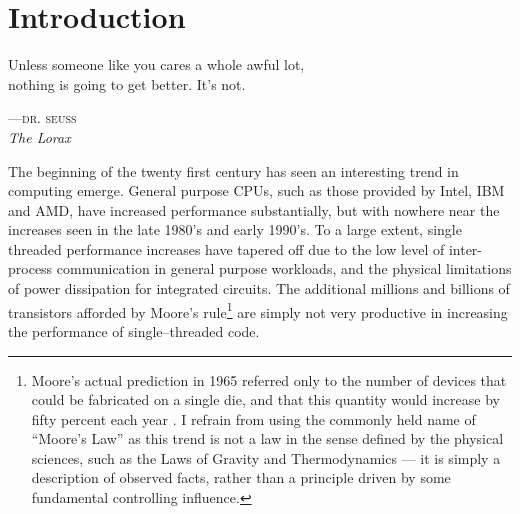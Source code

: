 
\chapter{Introduction}
\label{ch:introduction}

\epigraph{%
Unless someone like you cares a whole awful lot,\\
nothing is going to get better. It's not.}%
{\textsc{---dr. seuss}\\\textit{The Lorax}}




The beginning of the twenty first century has seen an interesting trend in
computing emerge. General purpose CPUs, such as those provided by Intel, IBM and
AMD, have increased performance substantially, but with nowhere near the
increases seen in the late 1980's and early 1990's. To a large extent, single
threaded performance increases have tapered off due to the low level of
inter-process communication in general purpose workloads, and the physical
limitations of power dissipation for integrated circuits. The additional
millions and billions of transistors afforded by Moore's rule\footnote{Moore's
actual prediction in 1965 referred only to the number of devices that could be
fabricated on a single die, and that this quantity would increase by fifty
percent each year \cite{Moore:1965wc}. I refrain from using the commonly held
name of ``Moore's Law'' as this trend is not a law in the sense defined by the
physical sciences, such as the Laws of Gravity and Thermodynamics --- it is
simply a description of observed facts, rather than a principle driven by some
fundamental controlling influence.} are simply not very productive in increasing
the performance of single--threaded code.

